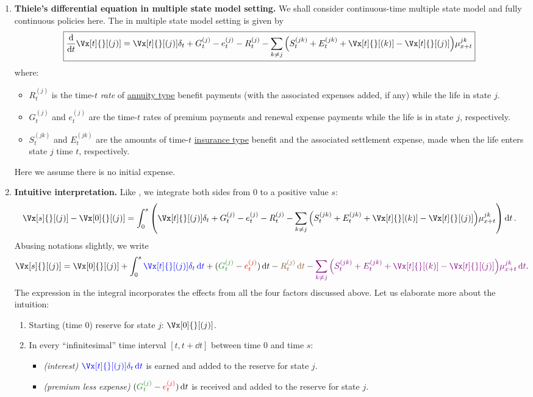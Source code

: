 \begin{enumerate}
\item\label{it:thiele-diff-eq-mult-state} \textbf{Thiele's differential
equation in multiple state model setting.} We shall consider continuous-time
multiple state model and fully continuous policies here. The  in multiple state model setting is given by
\[
\boxed{\dv{}{t}\Vx[t]{}[(j)]=\Vx[t]{}[(j)]\delta_t+G_t^{(j)}-e_{t}^{(j)}-R_t^{(j)}
-\sum_{k\ne j}^{}\qty(S_{t}^{(jk)}+E_{t}^{(jk)}+\Vx[t]{}[(k)]-\Vx[t]{}[(j)])\mu_{x+t}^{jk}}
\]
where:
\begin{itemize}
\item \(R_t^{(j)}\) is the time-\(t\) \emph{rate} of \underline{annuity type}
benefit payments (with the associated expenses added, if any) while the life in
state \(j\).
\item \(G_t^{(j)}\) and \(e_t^{(j)}\) are the time-\(t\) rates of premium
payments and renewal expense payments while the life is in state \(j\), respectively.
\item \(S_t^{(jk)}\) and \(E_t^{(jk)}\) are the amounts of time-\(t\)
\underline{insurance type} benefit and the associated settlement expense, made
when the life enters state \(j\)  time \(t\), respectively.
\end{itemize}
\begin{note}
Here we assume there is no initial expense.
\end{note}

\item \textbf{Intuitive interpretation.}
Like , we integrate both sides from \(0\)
to a positive value \(s\):
\[
\Vx[s]{}[(j)]-\Vx[0]{}[(j)]=
\int_{0}^{s}\qty(\Vx[t]{}[(j)]\delta_t+G_t^{(j)}-e_{t}^{(j)}-R_t^{(j)}
-\sum_{k\ne j}^{}\qty(S_{t}^{(jk)}+E_{t}^{(jk)}+\Vx[t]{}[(k)]-\Vx[t]{}[(j)])\mu_{x+t}^{jk})
\dd{t}.
\]
Abusing notations slightly, we write
\[
\Vx[s]{}[(j)]=\Vx[0]{}[(j)]+
\int_{0}^{s}\blc{\Vx[t]{}[(j)]\delta_t\dd{t}}
+(\gc{G_t^{(j)}}-\rc{e_{t}^{(j)}})\dd{t}
-\brc{R_t^{(j)}\dd{t}}
-\vc{\sum_{k\ne j}^{}\qty(S_{t}^{(jk)}+E_{t}^{(jk)}+\Vx[t]{}[(k)]-\Vx[t]{}[(j)])\mu_{x+t}^{jk}\dd{t}}
.
\]
The expression in the integral incorporates the effects from all the four
factors discussed above. Let us elaborate more about the intuition:
\begin{enumerate}[label={(\arabic*)}]
\item Starting (time 0) reserve for state \(j\): \(\Vx[0]{}[(j)]\).
\item In every ``infinitesimal'' time interval \([t,t+\dd{t}]\) between time
\(0\) and time \(s\):
\begin{itemize}
\item {} \emph{(interest)} \(\blc{\Vx[t]{}[(j)]\delta_t\dd{t}}\)
is earned and added to the reserve for state \(j\).
\item {} \emph{(premium less expense)}
\((\gc{G_t^{(j)}}-\rc{e_t^{(j)}})\dd{t}\) is received and added to the reserve
for state \(j\).


\end{itemize}
\end{enumerate}
\end{enumerate}
